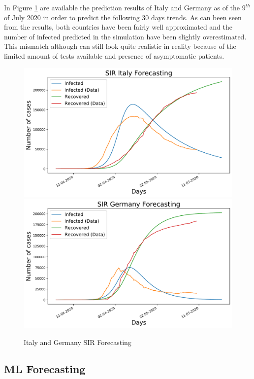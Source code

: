 In Figure \ref{sir_forecast} are available the prediction results of Italy and Germany as of the $9^{th}$ of July 2020 in order to predict the following 30 days trends. As can been seen from the results, both countries have been fairly well approximated and the number of infected predicted in the simulation have been slightly overestimated. This mismatch although can still look quite realistic in reality because of the limited amount of tests available and presence of asymptomatic patients.

\begin{figure}[ht!]%
    \centering
    \includegraphics[width=0.49\linewidth]{latex/images/Italy_preds.pdf}
    \includegraphics[width=0.49\linewidth]{latex/images/Germany_preds.pdf}
    \vspace{-0.2cm}
    \caption{Italy and Germany SIR Forecasting}
    \label{sir_forecast}
\end{figure}

\subsection{ML Forecasting}

